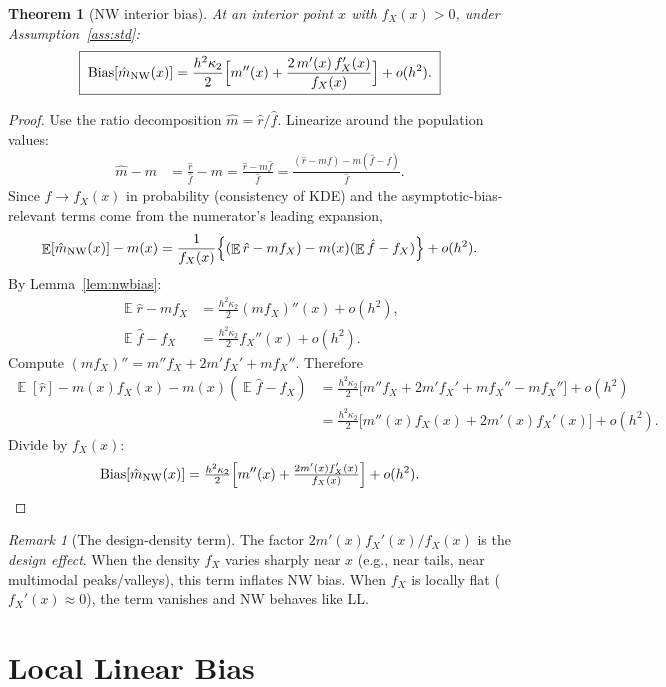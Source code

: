 \documentclass[11pt]{article}
\theoremstyle{plain}
\newtheorem{theorem}{Theorem}
\theoremstyle{definition}
\theoremstyle{remark}
\newtheorem*{remark}{Remark}
\DeclareMathOperator{\E}{\mathbb{E}}
\begin{document}
\begin{theorem}[NW interior bias]\label{thm:nwbias}
At an interior point $x$ with $f_X(x) > 0$, under Assumption~\ref{ass:std}:
\[
\boxed{\;
\text{Bias}[\hat m_{\text{NW}}(x)]
  = \frac{h^2 \kappa_2}{2}\Bigl[m''(x) + \frac{2\,m'(x)\,f_X'(x)}{f_X(x)}\Bigr]
  + o(h^2).\;}
\]
\end{theorem}

\begin{proof}
Use the ratio decomposition $\hat m = \hat r / \hat f$. Linearize around the population values:
\begin{align*}
\hat m - m
  &= \frac{\hat r}{\hat f} - m
   = \frac{\hat r - m\hat f}{\hat f}
   = \frac{(\hat r - mf) - m(\hat f - f)}{\hat f}.
\end{align*}
Since $\hat f \to f_X(x)$ in probability (consistency of KDE) and the
asymptotic-bias-relevant terms come from the numerator's leading expansion,
\[
\E[\hat m_{\text{NW}}(x)] - m(x) = \frac{1}{f_X(x)}\Bigl\{(\E\hat r - m f_X)
  - m(x)(\E\hat f - f_X)\Bigr\} + o(h^2).
\]
By Lemma~\ref{lem:nwbias}:
\begin{align*}
\E\hat r - m f_X &= \tfrac{h^2\kappa_2}{2}(m f_X)''(x) + o(h^2),\\
\E\hat f - f_X &= \tfrac{h^2\kappa_2}{2} f_X''(x) + o(h^2).
\end{align*}
Compute $(m f_X)'' = m'' f_X + 2 m' f_X' + m f_X''$. Therefore
\begin{align*}
\E[\hat r] - m(x) f_X(x) - m(x)(\E\hat f - f_X)
  &= \tfrac{h^2\kappa_2}{2}\bigl[m'' f_X + 2 m' f_X' + m f_X'' - m f_X''\bigr] + o(h^2)\\
  &= \tfrac{h^2\kappa_2}{2}\bigl[m''(x) f_X(x) + 2 m'(x) f_X'(x)\bigr] + o(h^2).
\end{align*}
Divide by $f_X(x)$:
\[
\text{Bias}[\hat m_{\text{NW}}(x)]
  = \tfrac{h^2\kappa_2}{2}\Bigl[m''(x) + \tfrac{2 m'(x) f_X'(x)}{f_X(x)}\Bigr] + o(h^2). \qedhere
\]
\end{proof}

\begin{remark}[The design-density term]
The factor $2 m'(x) f_X'(x) / f_X(x)$ is the \emph{design effect}. When the
density $f_X$ varies sharply near $x$ (e.g., near tails, near multimodal
peaks/valleys), this term inflates NW bias. When $f_X$ is locally flat
($f_X'(x) \approx 0$), the term vanishes and NW behaves like LL.
\end{remark}

\section{Local Linear Bias}\label{sec:ll}
\end{document}
